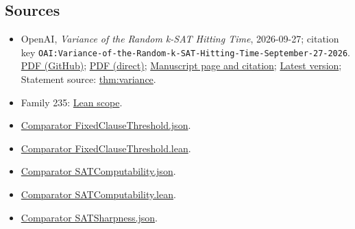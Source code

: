 \documentclass[11pt]{article}
\begin{document}
\subsection{Sources}
\begin{itemize}
\item OpenAI, \emph{Variance of the Random k-SAT Hitting Time}, 2026-09-27; citation key \texttt{OAI:Variance-of-the-Random-k-SAT-Hitting-Time-September-27-2026}. \href{https://github.com/openai/math/blob/adc7f1241b42e322a6451854ab7e4b4c146bf78a/preprints/Variance-of-the-Random-k-SAT-Hitting-Time-September-27-2026/article.pdf}{PDF (GitHub)}; \href{https://github.com/openai/math/raw/adc7f1241b42e322a6451854ab7e4b4c146bf78a/preprints/Variance-of-the-Random-k-SAT-Hitting-Time-September-27-2026/article.pdf}{PDF (direct)}; \href{https://github.com/openai/math/blob/adc7f1241b42e322a6451854ab7e4b4c146bf78a/preprints/Variance-of-the-Random-k-SAT-Hitting-Time-September-27-2026/README.md}{Manuscript page and citation}; \href{https://github.com/openai/math/blob/main/preprints/Variance-of-the-Random-k-SAT-Hitting-Time-September-27-2026/article.pdf}{Latest version}; Statement source: \href{https://github.com/openai/math/blob/adc7f1241b42e322a6451854ab7e4b4c146bf78a/preprints/Variance-of-the-Random-k-SAT-Hitting-Time-September-27-2026/build/source/sections/introduction.tex\#L27}{thm:variance}.
\item Family 235: \href{https://github.com/openai/math/blob/adc7f1241b42e322a6451854ab7e4b4c146bf78a/lean/docs/235.md}{Lean scope}.
\item \href{https://github.com/openai/math/blob/adc7f1241b42e322a6451854ab7e4b4c146bf78a/lean/ComparatorChallenges/FixedClauseThreshold.json}{Comparator FixedClauseThreshold.json}.
\item \href{https://github.com/openai/math/blob/adc7f1241b42e322a6451854ab7e4b4c146bf78a/lean/ComparatorChallenges/FixedClauseThreshold.lean}{Comparator FixedClauseThreshold.lean}.
\item \href{https://github.com/openai/math/blob/adc7f1241b42e322a6451854ab7e4b4c146bf78a/lean/ComparatorChallenges/SATComputability.json}{Comparator SATComputability.json}.
\item \href{https://github.com/openai/math/blob/adc7f1241b42e322a6451854ab7e4b4c146bf78a/lean/ComparatorChallenges/SATComputability.lean}{Comparator SATComputability.lean}.
\item \href{https://github.com/openai/math/blob/adc7f1241b42e322a6451854ab7e4b4c146bf78a/lean/ComparatorChallenges/SATSharpness.json}{Comparator SATSharpness.json}.

\end{itemize}
\end{document}
